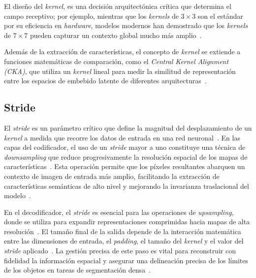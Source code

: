 El diseño del \textit{kernel}, es una decisión arquitectónica crítica que determina el campo receptivo; por ejemplo, mientras que los \textit{kernels} de $3 \times 3$ son el estándar por su eficiencia en \textit{hardware}, modelos modernos han demostrado que los \textit{kernels} de $7 \times 7$ pueden capturar un contexto global mucho más amplio~\cite{liu2022convnext}. 

Además de la extracción de características, el concepto de \textit{kernel} se extiende a funciones matemáticas de comparación, como el \textit{Central Kernel Alignment (CKA)}, que utiliza un \textit{kernel} lineal para medir la similitud de representación entre los espacios de embebido latente de diferentes arquitecturas~\cite{iana2024peeling}.

\subsection{Stride}
El \textit{stride} es un parámetro crítico que define la magnitud del desplazamiento de un \textit{kernel} a medida que recorre los datos de entrada en una red neuronal~\cite{ji2022automation, dumoulin2018guide}. En las capas del codificador, el uso de un \textit{stride} mayor a uno constituye una técnica de \textit{downsampling} que reduce progresivamente la resolución espacial de los mapas de características~\cite{badrinarayanan2016segnet, ronneberger2015unet}. Esta operación permite que los píxeles resultantes abarquen un contexto de imagen de entrada más amplio, facilitando la extracción de características semánticas de alto nivel y mejorando la invarianza traslacional del modelo~\cite{ji2022automation, badrinarayanan2016segnet, liu2022convnext}.

En el decodificador, el \textit{stride} es esencial para las operaciones de \textit{upsampling}, donde se utiliza para expandir representaciones comprimidas hacia mapas de alta resolución~\cite{ji2022automation, badrinarayanan2016segnet}. El tamaño final de la salida depende de la interacción matemática entre las dimensiones de entrada, el \textit{padding}, el tamaño del \textit{kernel} y el valor del \textit{stride} aplicado~\cite{ji2022automation, tan2019efficientnet}. La gestión precisa de este paso es vital para reconstruir con fidelidad la información espacial y asegurar una delineación precisa de los límites de los objetos en tareas de segmentación densa~\cite{ronneberger2015unet, howard2019mobilenetv3, bala2025visiontranscoder}.

